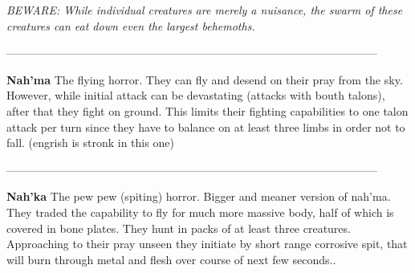 \documentclass[14p]{book}
\begin{document}
\emph{BEWARE: While individual creatures are merely a nuisance, the swarm of these creatures can eat down even the largest behemoths.}

{\color{l} ---------------------------------------------------------------------------------------------------\\}

\textbf{Nah'ma} The flying horror. They can fly and desend on their pray from the sky. However, while initial attack can be devastating (attacks with bouth talons), after that they fight on ground. This limits their fighting capabilities to one talon attack per turn since they have to balance on at least three limbs in order not to fall. (engrish is stronk in this one)
 

{\color{l} ---------------------------------------------------------------------------------------------------\\}

\textbf{Nah'ka} The pew pew (spiting) horror. Bigger and meaner version of nah’ma. They traded the capability to fly for much more massive body, half of which is covered in bone plates. They hunt in packs of at least three creatures. Approaching to their pray unseen they initiate by short range corrosive spit, that will burn through metal and flesh over course of next few seconds..
\end{document}

